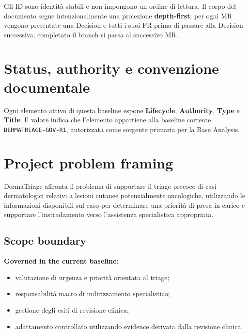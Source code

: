 \documentclass[11pt,a4paper]{article}
\begin{document}
\begin{statusbox}[title={Reading convention}]
Gli ID sono identità stabili e non impongono un ordine di lettura. Il corpo del documento segue intenzionalmente una proiezione \textbf{depth-first}: per ogni MR vengono presentate una Decision e tutti i suoi FR prima di passare alla Decision successiva; completato il branch si passa al successivo MR.
\end{statusbox}

\tableofcontents
\clearpage

\section{Status, authority e convenzione documentale}

\begin{projectbox}[title={Authority statement}]
Ogni elemento attivo di questa baseline espone \textbf{Lifecycle}, \textbf{Authority}, \textbf{Type} e \textbf{Title}. Il valore \candidateauthority{} indica che l'elemento appartiene alla baseline corrente \texttt{DERMATRIAGE-GOV-R1}, autorizzata come sorgente primaria per la Base Analysis.
\end{projectbox}

\section{Project problem framing}

\begin{projectbox}
DermaTriage affronta il problema di supportare il triage precoce di casi dermatologici relativi a lesioni cutanee potenzialmente oncologiche, utilizzando le informazioni disponibili sul caso per determinare una priorità di presa in carico e supportare l'instradamento verso l'assistenza specialistica appropriata.
\end{projectbox}

\subsection{Scope boundary}

\textbf{Governed in the current baseline:}
\begin{itemize}
\item valutazione di urgenza e priorità orientata al triage;
\item responsabilità macro di indirizzamento specialistico;
\item gestione degli esiti di revisione clinica;
\item adattamento controllato utilizzando evidence derivata dalla revisione clinica.
\end{itemize}
\end{document}

